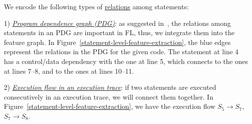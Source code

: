 

We encode the following types of \underline{relations} among
statements:

1) {\em \underline{Program dependence graph (PDG)}}: as suggested
in~\cite{icse21-fl}, the relations among statements in an PDG are
important in FL, thus, we integrate them into the feature graph. In
Figure~\ref{statement-level-feature-extraction}, the blue edges
represent the relations in the PDG for the given code.  The statement
at line 4 has a control/data dependency with the one at line 5, which
connects to the ones at lines 7--8, and to the ones at lines 10--11.

2) {\em \underline{Execution flow in an execution trace}}: if two
statements are executed consecutively in an execution trace, we will
connect them together. In
Figure~\ref{statement-level-feature-extraction}, we have the execution
flow $S_5 \rightarrow S_7$, $S_7 \rightarrow S_8$.


